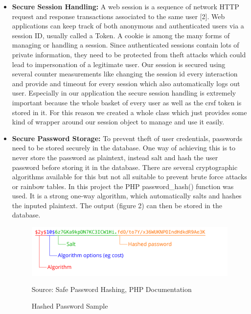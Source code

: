 \documentclass[12pt,a4paper]{article}
\begin{document}
	\begin{itemize}
		\item \textbf{Secure Session Handling:} A web session is a sequence of network HTTP request and response transactions associated to the same user [2]. 
		Web applications can keep track of both anonymous and authenticated users via a session ID, usually called a Token. A cookie is among the many forms of managing or handling a session. Since authenticated sessions contain lots of private information, they need to be protected from theft attacks which could lead to impersonation of a legitimate user. Our session is secured using several counter measurements like changing the session id every interaction and provide and timeout for every session which also automatically logs out user. Especially in our application the secure session handling is extremely important because the whole basket of every user as well as the crsf token is stored in it. For this reason we created a whole class which just provides some kind of wrapper around our session object to manage and use it easily.
		
		\item \textbf{Secure Password Storage:} To prevent theft of user credentials, passwords need to be stored securely in the database. One way of achieving this is to never store the password as plaintext, instead salt and hash the user password before storing it in the database. There are several cryptographic algorithms available for this but not all suitable to prevent brute force attacks or rainbow tables. In this project the PHP password\_hash() function was used. It is a strong one-way algorithm, which automatically salts and hashes the inputed plaintext. The output (figure 2) can then be stored in the database.
		\begin{figure}[h]
			\begin{center}
				\includegraphics [scale = 0.3] {algo}
				\caption{Hashed Password Sample}
				Source: Safe Password Hashing, PHP Documentation
			\end{center}
		\end{figure}
		

\end{itemize}
\end{document}
